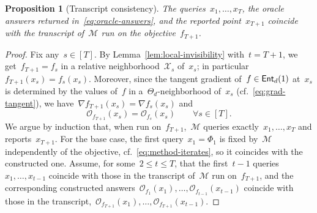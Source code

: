 \documentclass[11pt]{article}
\numberwithin{equation}{section}
\let\le\leqslant
\newtheorem{proposition}[theorem]{Proposition}
\theoremstyle{remark}
\newcommand{\R}{\mathbb{R}}
\newcommand{\Ent}{\textup{\textsf{Ent}}}
\newcommand{\Orc}{\mathscr{O}}
\newcommand{\Mtd}{\mathscr{M}}
\newcommand{\Fh}{\Ent_d}
\newcommand{\Tan}{\Theta_d}
\newcommand{\prox}{\operatorname{prox}}
\newcommand{\1}{\mathbf{1}}
\newcommand{\bnabla}{\nabla}
\begin{document}
\begin{proposition}[Transcript consistency]
\label{prop:transcript}
The queries~$x_1,\dots,x_T$, the oracle answers returned in~\eqref{eq:oracle-answers}, and the reported point~$x_{T+1}$ coincide with the transcript of~$\Mtd$ run on the objective~$f_{T+1}$.
\end{proposition}
%
\begin{proof}
Fix any~$s\in [T]$. 
By Lemma~\ref{lem:local-invisibility} with~$t = T+1$, we get~$f_{T+1}=f_s$ in a relative neighborhood~$\mathcal{X}_s$ of~$x_s$; in particular~$f_{T+1}(x_s)=f_s(x_s)$. 
Moreover, since the tangent gradient of~$f \in \Fh(1)$ at~$x_s$ is determined by the values of~$f$ in a~$\Tan$-neighborhood of~$x_s$ (cf.~\eqref{eq:grad-tangent}), we have~$\bnabla f_{T+1}(x_s)=\bnabla f_s(x_s)$ and
\begin{equation}
\label{eq:oracle-equal}
\Orc_{f_{T+1}}(x_s)=\Orc_{f_s}(x_s) \qquad \forall s \in [T].
\end{equation}
%
We argue by induction that, when run on~$f_{T+1}$,~$\Mtd$ queries exactly~$x_1,\dots,x_T$ and reports~$x_{T+1}$. For the base case, the first query~$x_1=\Phi_1$ is fixed by~$\Mtd$ independently of the objective, cf.~\eqref{eq:method-iterates}, so it coincides with the constructed one. 
Assume, for some~$2 \le t \le T$, that the first~$t-1$ queries~$x_1,\dots,x_{t-1}$ coincide with those in the transcript of~$\Mtd$ run on~$f_{T+1}$, and the corresponding constructed answers~$\Orc_{f_{1}}(x_1), \dots, \Orc_{f_{t-1}}(x_{t-1})$ coincide with those in the transcript,~$\Orc_{f_{T+1}}(x_1), \dots, \Orc_{f_{T+1}}(x_{t-1})$. 

\end{proof}
\end{document}

